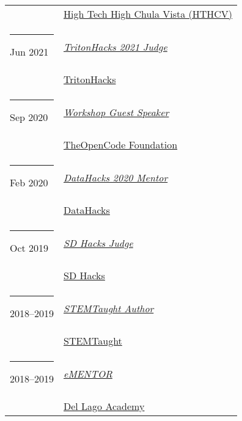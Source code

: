 \documentclass[margin,line]{res}
\begin{document}
\begin{resume}
\begin{longtable}{@{}p{0.7in}p{4in}}
\hspace*{-4mm} & \hspace{4mm} \href{https://www.hightechhigh.org/hthcv/}{High Tech High Chula Vista (HTHCV)}\\
\hspace*{-4mm} \rule{-1mm}{5mm} Jun 2021 & \href{https://www.tritonhacks.org/}{\textit{TritonHacks 2021 Judge}}\\*
\hspace*{-4mm} & \hspace{4mm} \href{https://www.tritonhacks.org/}{TritonHacks}\\
\hspace*{-4mm} \rule{-1mm}{5mm} Sep 2020 & \href{https://www.theopencode.org/}{\textit{Workshop Guest Speaker}}\\*
\hspace*{-4mm} & \hspace{4mm} \href{https://www.theopencode.org/}{TheOpenCode Foundation}\\
\hspace*{-4mm} \rule{-1mm}{5mm} Feb 2020 & \href{http://datahacks.tech/}{\textit{DataHacks 2020 Mentor}}\\*
\hspace*{-4mm} & \hspace{4mm} \href{http://datahacks.tech/}{DataHacks}\\
\hspace*{-4mm} \rule{-1mm}{5mm} Oct 2019 & \href{https://www.sdhacks.io/}{\textit{SD Hacks Judge}}\\*
\hspace*{-4mm} & \hspace{4mm} \href{https://www.sdhacks.io/}{SD Hacks}\\
\hspace*{-4mm} \rule{-1mm}{5mm} 2018--2019 & \href{https://www.stemtaught.com/writingcontestoverview}{\textit{STEMTaught Author}}\\*
\hspace*{-4mm} & \hspace{4mm} \href{https://www.stemtaught.com/}{STEMTaught}\\
\hspace*{-4mm} \rule{-1mm}{5mm} 2018--2019 & \href{https://www.dellagoacademy.org/apps/pages/index.jsp?uREC_ID=1248617&type=d&pREC_ID=1474743}{\textit{eMENTOR}}\\*
\hspace*{-4mm} & \hspace{4mm} \href{https://www.dellagoacademy.org/}{Del Lago Academy}\\

\end{longtable}
\end{resume}
\end{document}
